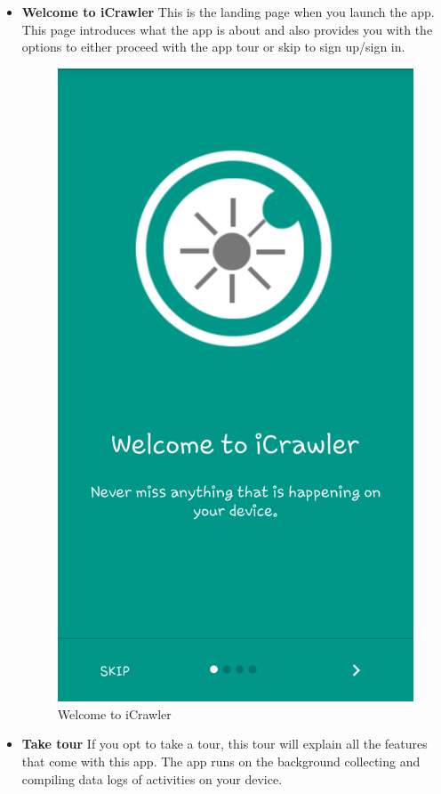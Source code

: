 \documentclass[hidelinks, 12pt, oneside]{article}
\begin{document}
	 \begin{itemize}
	 	\item \textbf{Welcome to iCrawler}\newline
	 	This is the landing page when you launch the app. This page introduces what the app is about and also provides you
	 	with the options to either proceed with the app tour or skip to sign up/sign in.
	 	 
	 	 \begin{figure}[h!]
	 	 	\caption{Welcome to iCrawler}
	 	 	\centering 																																		\includegraphics[width=0.5 \textwidth]{img/newImgs/landingPage.png}
	 	 \end{figure}\newpage
	 	 
		\item \textbf{Take tour}\newline
	 	If you opt to take a tour, this tour will explain all the features that come with this app.\newline\newline
	 	The app runs on the background collecting and compiling data logs of activities on your device. 
	 	 

\end{itemize}
\end{document}
